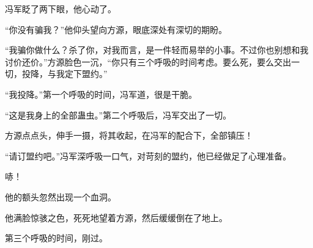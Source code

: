 \begin{this_body}
冯军眨了两下眼，他心动了。

“你没有骗我？”他仰头望向方源，眼底深处有深切的期盼。

“我骗你做什么？杀了你，对我而言，是一件轻而易举的小事。不过你也别想和我讨价还价。”方源脸色一沉，“你只有三个呼吸的时间考虑。要么死，要么交出一切，投降，与我定下盟约。”

“我投降。”第一个呼吸的时间，冯军道，很是干脆。

“这是我身上的全部蛊虫。”第二个呼吸后，冯军交出了一切。

方源点点头，伸手一摄，将其收起，在冯军的配合下，全部镇压！

“请订盟约吧。”冯军深呼吸一口气，对苛刻的盟约，他已经做足了心理准备。

哧！

他的额头忽然出现一个血洞。

他满脸惊骇之色，死死地望着方源，然后缓缓倒在了地上。

第三个呼吸的时间，刚过。

\end{this_body}

